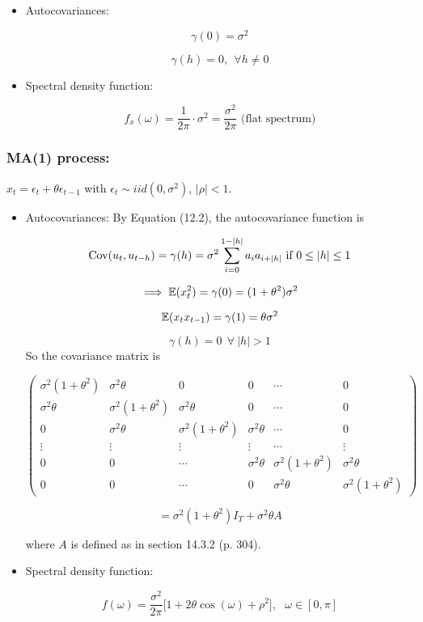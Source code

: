 \begin{itemize}

\item Autocovariances: 

\[
\gamma(0) = \sigma^2
\]

\[
\gamma(h) =0, \ \ \forall h \neq 0
\]

\item Spectral density function:

\[
f_x(\omega) = \frac{1}{2\pi} \cdot \sigma^2 = \frac{\sigma^2}{2 \pi} \text{ (flat spectrum)}
\]

\end{itemize}


\subsubsection{MA(1) process:} \(x_t = \epsilon_t + \theta \epsilon_{t-1}\) with \(\epsilon_t \sim iid(0, \sigma^2)\), \(|\rho| < 1\). 

\begin{itemize}

\item Autocovariances: By Equation (12.2), the autocovariance function is

\[
\Cov(u_t, u_{t-h})  = \gamma(h) = \sigma^2 \sum_{i=0}^{1 - |h|} a_i a_{i + |h|} \text{ if } 0 \leq |h| \leq 1
\]

\[
\implies \E(x_t^2) = \gamma(0) = (1 + \theta^2)\sigma^2
\]

\[
 \E(x_t x_{t-1}) =  \gamma(1) = \theta \sigma^2
\]

\[
\gamma(h) = 0 \ \ \forall \ |h| > 1
\]
So the covariance matrix is

\[
\begin{pmatrix} 
\sigma^2(1+\theta^2) & \sigma^2\theta & 0 & 0 & \cdots & 0 \\
\sigma^2\theta & \sigma^2(1+\theta^2) & \sigma^2\theta & 0 & \cdots & 0 \\
0 & \sigma^2\theta & \sigma^2(1+\theta^2) & \sigma^2\theta & \cdots & 0 \\
\vdots & \vdots & \vdots & \vdots & \cdots & \vdots \\
 0 & 0& \cdots & \sigma^2\theta  & \sigma^2(1+\theta^2)   & \sigma^2\theta  \\
0 & 0 &  \cdots & 0  & \sigma^2\theta  & \sigma^2(1+\theta^2) 
\end{pmatrix} 
\]

\[
= \sigma^2(1 + \theta^2)I_T + \sigma^2 \theta A
\]

where \(A\) is defined as in section 14.3.2 (p. 304).

\item Spectral density function:

\[
f(\omega) = \frac{\sigma^2}{2\pi} \big[ 1+ 2  \theta \cos( \omega)  + \rho^2  \big] , \ \ \ \omega \in [0, \pi]
 \]

\end{itemize}




